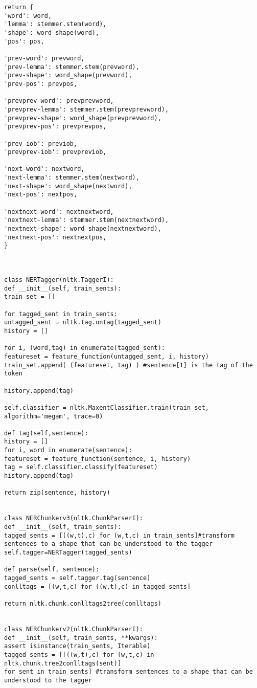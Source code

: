 \documentclass{pre-tfg}
\begin{document}
\begin{lstlisting}[style=consola]
return {
'word': word,
'lemma': stemmer.stem(word),
'shape': word_shape(word),
'pos': pos,

'prev-word': prevword,
'prev-lemma': stemmer.stem(prevword),
'prev-shape': word_shape(prevword),
'prev-pos': prevpos,

'prevprev-word': prevprevword,
'prevprev-lemma': stemmer.stem(prevprevword),
'prevprev-shape': word_shape(prevprevword),
'prevprev-pos': prevprevpos,

'prev-iob': previob,
'prevprev-iob': prevpreviob,

'next-word': nextword,
'next-lemma': stemmer.stem(nextword),
'next-shape': word_shape(nextword),
'next-pos': nextpos,

'nextnext-word': nextnextword,
'nextnext-lemma': stemmer.stem(nextnextword),
'nextnext-shape': word_shape(nextnextword),
'nextnext-pos': nextnextpos,
}



class NERTagger(nltk.TaggerI):
def __init__(self, train_sents):
train_set = []

for tagged_sent in train_sents:
untagged_sent = nltk.tag.untag(tagged_sent)
history = []

for i, (word,tag) in enumerate(tagged_sent):
featureset = feature_function(untagged_sent, i, history)
train_set.append( (featureset, tag) ) #sentence[1] is the tag of the token

history.append(tag)

self.classifier = nltk.MaxentClassifier.train(train_set,
algorithm='megam', trace=0)

def tag(self,sentence):
history = []
for i, word in enumerate(sentence):
featureset = feature_function(sentence, i, history)
tag = self.classifier.classify(featureset)
history.append(tag)

return zip(sentence, history)


class NERChunkerv3(nltk.ChunkParserI):
def __init__(self, train_sents):
tagged_sents = [((w,t),c) for (w,t,c) in train_sents]#transform sentences to a shape that can be understood to the tagger
self.tagger=NERTagger(tagged_sents)

def parse(self, sentence):
tagged_sents = self.tagger.tag(sentence)
conlltags = [(w,t,c) for ((w,t),c) in tagged_sents]

return nltk.chunk.conlltags2tree(conlltags)


class NERChunkerv2(nltk.ChunkParserI):
def __init__(self, train_sents, **kwargs):
assert isinstance(train_sents, Iterable)
tagged_sents = [[((w,t),c) for (w,t,c) in
nltk.chunk.tree2conlltags(sent)]
for sent in train_sents] #transform sentences to a shape that can be understood to the tagger


\end{lstlisting}
\end{document}
